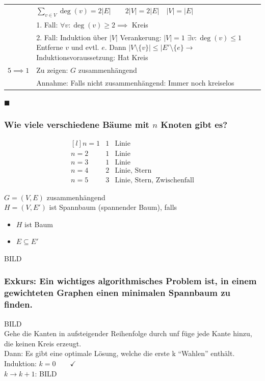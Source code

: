 \begin{satz*}
\begin{bew}
\begin{tabular}{l p{9cm} }
						&$\sum_{v \in V} \deg(v) = 2 |E| \qquad 2|V| = 2|E| \quad |V| = |E|$ \\
						&1. Fall: $\forall v : \deg(v) \geq 2 \implies$ Kreis \\
						&2. Fall: Induktion über $|V|$ Verankerung: $|V| = 1$ $\exists v : \deg(v) \leq 1$ Entferne $v$ und evtl. $e$. Dann $|V \setminus \{v\}| \leq |E' \setminus \{e\} \rightarrow$ Induktionsvoraussetzung: Hat Kreis \\
			$5 \implies 1$	&Zu zeigen: $G$ zusammenhängend\\
						&Annahme: Falls nicht zusammenhängend: Immer noch kreiselos \lightning
		\end{tabular}
		$\blacksquare$
	\end{bew}
\end{satz*}

\subsubsection{Wie viele verschiedene Bäume mit \texorpdfstring{$n$}{n} Knoten gibt es?}
\[
	\begin{matrix*}[l]
		n = 1	& 1	& \text{Linie}		\\
		n = 2	& 1	& \text{Linie}		\\
		n = 3	& 1	& \text{Linie}		\\
		n = 4	& 2	& \text{Linie, Stern}	\\
		n = 5	& 3	& \text{Linie, Stern, Zwischenfall}
	\end{matrix*}
\]
\begin{def*}[note = Spannbaum , index = Spannbaum]
	$G=(V,E)$ zusammenhängend \\
	$H=(V,E')$ ist Spannbaum (spannender Baum), falls
	\begin{itemize}
		\item $H$ ist Baum
		\item $E \subseteq E'$
	\end{itemize}
\end{def*}
\begin{bsp*}
BILD
\end{bsp*}

\subsubsection{Exkurs: Ein wichtiges algorithmisches Problem ist, in einem \textbf{gewichteten Graphen} einen minimalen Spannbaum zu finden.}
\begin{bsp*}[note = \enquote{Gieriger} Algorithmus]
BILD\\
Gehe die Kanten in aufsteigender Reihenfolge durch unf füge jede Kante hinzu, die keinen Kreis erzeugt.\\
Dann: Es gibt eine optimale Lösung, welche die erste k \enquote{Wahlen} enthält.\\
Induktion: $k=0 \qquad \checkmark$ \\
$k \rightarrow k+1$: BILD \\
\end{bsp*}

